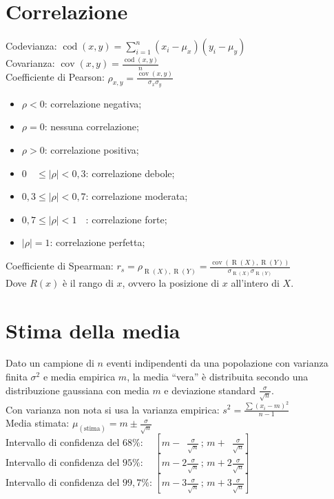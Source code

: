 \documentclass[10pt,landscape]{article}
\begin{document}
\begin{multicols}{3}
\section{Correlazione}
Codevianza: $\operatorname{cod}(x, y) = \sum_{i=1}^n (x_i - \mu_x)(y_i - \mu_y)$ \\
Covarianza: $\operatorname{cov}(x, y) = \frac{\operatorname{cod}(x, y)}{n}$ \\
Coefficiente di Pearson: $\rho_{x, y} = \frac{\operatorname{cov}(x, y)}{\sigma_x \sigma_y}$ \\
\begin{itemize}
	\item $\rho < 0$: correlazione negativa;
	\item $\rho = 0$: nessuna correlazione;
	\item $\rho > 0$: correlazione positiva;
	\item $0\phantom{,0} \le |\rho| < 0,3$: correlazione debole;
	\item $0,3 \le |\rho| < 0,7$: correlazione moderata;
	\item $0,7 \le |\rho| < 1\phantom{,0}$: correlazione forte;
	\item $|\rho| = 1$: correlazione perfetta;
\end{itemize}
Coefficiente di Spearman: $r_s = \rho_{\operatorname{R}(X),\operatorname{R}(Y)} = \frac{\operatorname{cov}(\operatorname{R}(X),\operatorname{R}(Y))}{\sigma_{\operatorname{R}(X)}\sigma_{\operatorname{R}(Y)}}$ \\
Dove $R(x)$ è il rango di $x$, ovvero la posizione di $x$ all'intero di $X$. \\

\section{Stima della media}
Dato un campione di $n$ eventi indipendenti da una popolazione con varianza finita $\sigma^2$ e media empirica $m$, la media ``vera'' è distribuita secondo una distribuzione gaussiana con media $m$ e deviazione standard $\frac{\sigma}{\sqrt{n}}$. \\
Con varianza non nota si usa la varianza empirica: $s^2 = \frac{\sum (x_i - m)^2}{n - 1}$ \\
Media stimata: $\mu_{(\text{stima})} = m \pm \frac{\sigma}{\sqrt{n}}$ \\
Intervallo di confidenza del $68\%$: $\phantom{,3} [m - \phantom{1}\frac{\sigma}{\sqrt{n}} \, ; \, m + \phantom{1}\frac{\sigma}{\sqrt{n}}]$ \\
Intervallo di confidenza del $95\%$: $\phantom{,5} [m - 2\frac{\sigma}{\sqrt{n}} \, ; \, m + 2\frac{\sigma}{\sqrt{n}}]$ \\
Intervallo di confidenza del $99,7\%$: $[m - 3\frac{\sigma}{\sqrt{n}} \, ; \, m + 3\frac{\sigma}{\sqrt{n}}]$ \\


\end{multicols}
\end{document}
